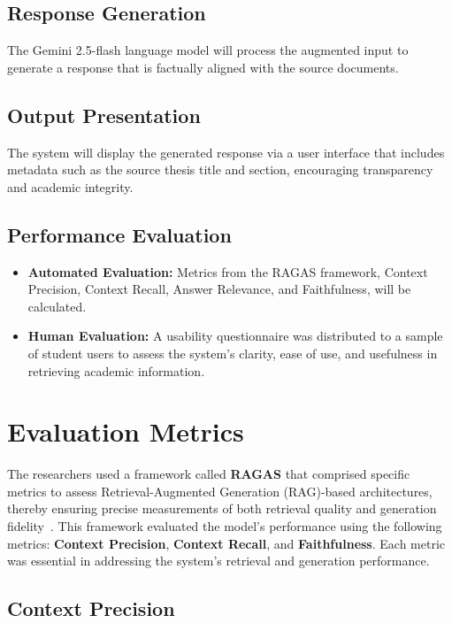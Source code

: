 \begin{refsection}
\subsection*{Response Generation}

The Gemini 2.5-flash language model will process the augmented input to generate a response that is factually aligned with the source documents.

\subsection*{Output Presentation}

The system will display the generated response via a user interface that includes metadata such as the source thesis title and section, encouraging transparency and academic integrity.

\subsection*{Performance Evaluation}

\begin{itemize}
    \item \textbf{Automated Evaluation:} Metrics from the RAGAS framework, Context Precision, Context Recall, Answer Relevance, and Faithfulness, will be calculated.
    \item \textbf{Human Evaluation:} A usability questionnaire was distributed to a sample of student users to assess the system’s clarity, ease of use, and usefulness in retrieving academic information.
\end{itemize}

\section{Evaluation Metrics}

\hspace{0.4cm}The researchers used a framework called \textbf{RAGAS} that comprised specific metrics to assess Retrieval-Augmented Generation (RAG)-based architectures, thereby ensuring precise measurements of both retrieval quality and generation fidelity~\cite{oubah2024advanced}. This framework evaluated the model's performance using the following metrics: \textbf{Context Precision}, \textbf{Context Recall}, and \textbf{Faithfulness}. Each metric was essential in addressing the system’s retrieval and generation performance.

\subsection*{Context Precision}


\end{refsection}
